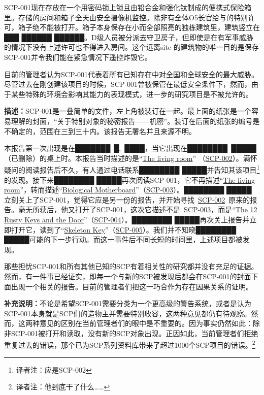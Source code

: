 \documentclass[openany,a4paper]{book} %
\begin{document}
SCP-001现在存放在一个用密码锁上锁且由铅合金和强化钛制成的便携式保险箱里。存储的房间和箱子全天由安全摄像机监控。除非有全体O5长官给与的特别许可，箱子绝不能被打开。箱子本身保存在小而全部照亮的独栋建筑里，建筑竖立在███ ██████ ██████。D级人员被分派去守卫房子，但即使是在有军事威胁的情况下没有上述许可也不得进入房间。这个远离site 的建筑物的唯一目的是保存SCP-001并令我们能在紧急情况下遥控炸毁它。\vspace{12pt}

目前的管理者认为SCP-001代表着所有已知存在中对全国和全球安全的最大威胁。尽管过去在刚创建该项目的时候，SCP-001曾被保管在最低安全条件下，然而，由于某些特殊的环境会影响其能力的表现模式，进一步的研究项目是不被允许的。\vspace{12pt}

\textbf{描述：}SCP-001是一叠简单的文件，左上角被装订在一起。最上面的纸张是一个容易理解的封面，“关于特别对象的秘密报告——机密”。装订在后面的纸张的编号是不确定的，范围在三到三十内。该报告无署名并且来源不明。\vspace{12pt}

本报告第一次出现是在███████\ █,\ ████，当它出现在████████\ █████（已删除）的桌上时。本报告当时描述的是“\hyperref[chap:SCP-002]{The living room}” （\hyperref[chap:SCP-002]{SCP-002}）。满怀疑问的阅读报告后不久，有人通过电话联系████████ █████并告知其该项目\footnote{译者注：应是SCP-002}的发现。接下来████████ █████再次阅读SCP-001，它不再描述“\hyperref[chap:SCP-002]{The living room}”，转而描述“\hyperref[chap:SCP-003]{Biological Motherboard}”（\hyperref[chap:SCP-003]{SCP-003}）。████████ █████ 立刻关上了SCP-001，觉得它应是另一份的报告，并开始寻找~\hyperref[chap:SCP-002]{SCP-002}~原来的报告。毫无所获后，他又打开了SCP-001，这次它描述不是~\hyperref[chap:SCP-003]{SCP-003}，而是“\hyperref[chap:SCP-004]{The 12 Rusty Keys and the Door}”（\hyperref[chap:SCP-004]{SCP-004}）。████████ █████再次关上报告并立即打开它，读到了“\hyperref[chap:SCP-005]{Skeleton Key}”（\hyperref[chap:SCP-005]{SCP-005}）。我们并不知晓████████ █████可能的下一步行动。而这一事件后不同长短的时间里，上述项目都被发现。\vspace{12pt}

那些担忧SCP-001和所有其他已知的SCP有着相关性的研究都并没有充足的证据。然而，有一件事已经证实，即每一个与新的SCP被发现后都会在SCP-001的封面下面出现一个相关的报告。目前的管理者们把这一巧合作为存在因果关系的证明。\vspace{12pt}

\textbf{补充说明：}不论是希望SCP-001需要分类为一个更高级的警告系统，或者是认为SCP-001本身就是SCP们的造物主并需要特别收容，这两种意见都仍有待观察。然而，这两种意见的区别在当前管理者们的眼中是不重要的。因为事实仍然如此：除非SCP-001被打开和读取，没有新的SCP对象出现。正因如此，当前管理者们拒绝重复过去的错误，那个已为SCP系列资料库带来了超过1000个SCP项目的错误。\footnote{译者注：他到底干了什么……}\vspace{12pt}
\end{document}
